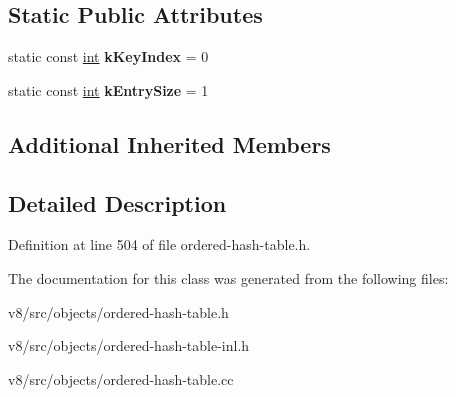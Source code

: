 \subsection*{Static Public Attributes}
\begin{DoxyCompactItemize}
\item 
\mbox{\label{classv8_1_1internal_1_1SmallOrderedHashSet_abcab4a0d565d9ceacebb155bdd2442f5}} 
static const \mbox{\hyperlink{classint}{int}} {\bfseries k\+Key\+Index} = 0
\item 
\mbox{\label{classv8_1_1internal_1_1SmallOrderedHashSet_ab0cf8e2755dcd014a2c28161114d346d}} 
static const \mbox{\hyperlink{classint}{int}} {\bfseries k\+Entry\+Size} = 1
\end{DoxyCompactItemize}
\subsection*{Additional Inherited Members}


\subsection{Detailed Description}


Definition at line 504 of file ordered-\/hash-\/table.\+h.



The documentation for this class was generated from the following files\+:\begin{DoxyCompactItemize}
\item 
v8/src/objects/ordered-\/hash-\/table.\+h\item 
v8/src/objects/ordered-\/hash-\/table-\/inl.\+h\item 
v8/src/objects/ordered-\/hash-\/table.\+cc\end{DoxyCompactItemize}
